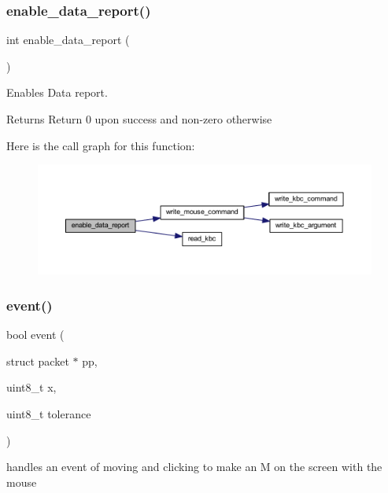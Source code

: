 \subsubsection{\texorpdfstring{enable\_data\_report()}{enable\_data\_report()}}
{\footnotesize\ttfamily int enable\+\_\+data\+\_\+report (\begin{DoxyParamCaption}{ }\end{DoxyParamCaption})}



Enables Data report. 

\begin{DoxyReturn}{Returns}
Return 0 upon success and non-\/zero otherwise 
\end{DoxyReturn}
Here is the call graph for this function\+:
\nopagebreak
\begin{figure}[H]
\begin{center}
\leavevmode
\includegraphics[width=350pt]{group__mouse_ga898e9289d77e1290373396a43ee9c53d_cgraph}
\end{center}
\end{figure}
\mbox{\label{group__mouse_ga0fff8c8e9b1e2af4e52d276fba5aff0b}} 
\subsubsection{\texorpdfstring{event()}{event()}}
{\footnotesize\ttfamily bool event (\begin{DoxyParamCaption}\item[{struct packet $\ast$}]{pp,  }\item[{uint8\+\_\+t}]{x,  }\item[{uint8\+\_\+t}]{tolerance }\end{DoxyParamCaption})}



handles an event of moving and clicking to make an M on the screen with the mouse 


